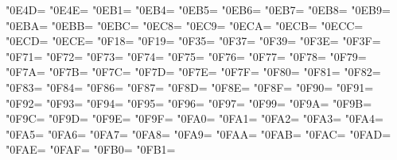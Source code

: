 \XeTeXcharclass"0E4D=\KclassCM
\XeTeXcharclass"0E4E=\KclassCM
\XeTeXcharclass"0EB1=\KclassCM
\XeTeXcharclass"0EB4=\KclassCM
\XeTeXcharclass"0EB5=\KclassCM
\XeTeXcharclass"0EB6=\KclassCM
\XeTeXcharclass"0EB7=\KclassCM
\XeTeXcharclass"0EB8=\KclassCM
\XeTeXcharclass"0EB9=\KclassCM
\XeTeXcharclass"0EBA=\KclassCM
\XeTeXcharclass"0EBB=\KclassCM
\XeTeXcharclass"0EBC=\KclassCM
\XeTeXcharclass"0EC8=\KclassCM
\XeTeXcharclass"0EC9=\KclassCM
\XeTeXcharclass"0ECA=\KclassCM
\XeTeXcharclass"0ECB=\KclassCM
\XeTeXcharclass"0ECC=\KclassCM
\XeTeXcharclass"0ECD=\KclassCM
\XeTeXcharclass"0ECE=\KclassCM
\XeTeXcharclass"0F18=\KclassCM
\XeTeXcharclass"0F19=\KclassCM
\XeTeXcharclass"0F35=\KclassCM
\XeTeXcharclass"0F37=\KclassCM
\XeTeXcharclass"0F39=\KclassCM
\XeTeXcharclass"0F3E=\KclassCM
\XeTeXcharclass"0F3F=\KclassCM
\XeTeXcharclass"0F71=\KclassCM
\XeTeXcharclass"0F72=\KclassCM
\XeTeXcharclass"0F73=\KclassCM
\XeTeXcharclass"0F74=\KclassCM
\XeTeXcharclass"0F75=\KclassCM
\XeTeXcharclass"0F76=\KclassCM
\XeTeXcharclass"0F77=\KclassCM
\XeTeXcharclass"0F78=\KclassCM
\XeTeXcharclass"0F79=\KclassCM
\XeTeXcharclass"0F7A=\KclassCM
\XeTeXcharclass"0F7B=\KclassCM
\XeTeXcharclass"0F7C=\KclassCM
\XeTeXcharclass"0F7D=\KclassCM
\XeTeXcharclass"0F7E=\KclassCM
\XeTeXcharclass"0F7F=\KclassCM
\XeTeXcharclass"0F80=\KclassCM
\XeTeXcharclass"0F81=\KclassCM
\XeTeXcharclass"0F82=\KclassCM
\XeTeXcharclass"0F83=\KclassCM
\XeTeXcharclass"0F84=\KclassCM
\XeTeXcharclass"0F86=\KclassCM
\XeTeXcharclass"0F87=\KclassCM
\XeTeXcharclass"0F8D=\KclassCM
\XeTeXcharclass"0F8E=\KclassCM
\XeTeXcharclass"0F8F=\KclassCM
\XeTeXcharclass"0F90=\KclassCM
\XeTeXcharclass"0F91=\KclassCM
\XeTeXcharclass"0F92=\KclassCM
\XeTeXcharclass"0F93=\KclassCM
\XeTeXcharclass"0F94=\KclassCM
\XeTeXcharclass"0F95=\KclassCM
\XeTeXcharclass"0F96=\KclassCM
\XeTeXcharclass"0F97=\KclassCM
\XeTeXcharclass"0F99=\KclassCM
\XeTeXcharclass"0F9A=\KclassCM
\XeTeXcharclass"0F9B=\KclassCM
\XeTeXcharclass"0F9C=\KclassCM
\XeTeXcharclass"0F9D=\KclassCM
\XeTeXcharclass"0F9E=\KclassCM
\XeTeXcharclass"0F9F=\KclassCM
\XeTeXcharclass"0FA0=\KclassCM
\XeTeXcharclass"0FA1=\KclassCM
\XeTeXcharclass"0FA2=\KclassCM
\XeTeXcharclass"0FA3=\KclassCM
\XeTeXcharclass"0FA4=\KclassCM
\XeTeXcharclass"0FA5=\KclassCM
\XeTeXcharclass"0FA6=\KclassCM
\XeTeXcharclass"0FA7=\KclassCM
\XeTeXcharclass"0FA8=\KclassCM
\XeTeXcharclass"0FA9=\KclassCM
\XeTeXcharclass"0FAA=\KclassCM
\XeTeXcharclass"0FAB=\KclassCM
\XeTeXcharclass"0FAC=\KclassCM
\XeTeXcharclass"0FAD=\KclassCM
\XeTeXcharclass"0FAE=\KclassCM
\XeTeXcharclass"0FAF=\KclassCM
\XeTeXcharclass"0FB0=\KclassCM
\XeTeXcharclass"0FB1=\KclassCM

